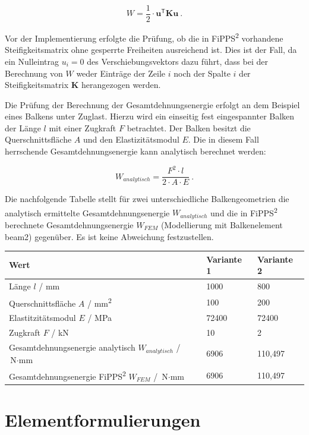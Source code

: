 \documentclass[11pt,titlepage,listof=totoc,bibliography=totoc,twoside]{scrreprt}
\newcommand{\transpose}{^\textsf{T}}
\begin{document}
\begin{equation}
  W = \frac{1}{2} \cdot \mathbf{u}\transpose \mathbf{K} \mathbf{u} \ .
\end{equation}

Vor der Implementierung erfolgte die Prüfung, ob die in FiPPS\textsuperscript{2} vorhandene Steifigkeitsmatrix ohne gesperrte Freiheiten ausreichend ist. Dies ist der Fall, da ein Nulleintrag $u_i = 0$ des Verschiebungsvektors dazu führt, dass bei der Berechnung von $W$ weder Einträge der Zeile $i$ noch der Spalte $i$ der Steifigkeitsmatrix $\mathbf{K}$ herangezogen werden.

Die Prüfung der Berechnung der Gesamtdehnungsenergie erfolgt an dem Beispiel eines Balkens unter Zuglast. Hierzu wird ein einseitig fest eingespannter Balken der Länge $l$ mit einer Zugkraft $F$ betrachtet. Der Balken besitzt die Querschnittsfläche $A$ und den Elastizitätsmodul $E$. Die in diesem Fall herrschende Gesamtdehnungsenergie kann analytisch berechnet werden:

\begin{equation}
  W_{analytisch} = \frac{F^2 \cdot l}{2 \cdot A \cdot E} \ .
\end{equation}

Die nachfolgende Tabelle stellt für zwei unterschiedliche Balkengeometrien die analytisch ermittelte Gesamtdehnungsenergie $W_{analytisch}$ und die in FiPPS\textsuperscript{2} berechnete Gesamtdehnungsenergie $W_{FEM}$ (Modellierung mit Balkenelement beam2) gegenüber. Es ist keine Abweichung festzustellen.

\begin{tabularx}{\textwidth}{Xll}
\toprule
Wert			& Variante 1			& Variante 2	\\
\midrule
Länge $l$ / mm & 1000 & 800 \\
Querschnittsfläche $A$ / mm\textsuperscript{2} & 100 & 200 \\
Elastitzitätsmodul $E$ / MPa & 72400 & 72400 \\
Zugkraft $F$ / kN & 10 & 2 \\
Gesamtdehnungsenergie analytisch $W_{analytisch}$ / $\text{N}\cdot\text{mm}$ & 6906 & 110,497 \\
Gesamtdehnungsenergie FiPPS\textsuperscript{2} $W_{FEM}$ / $\text{N}\cdot\text{mm}$ & 6906 & 110,497 \\
\bottomrule
\end{tabularx}

\chapter{Elementformulierungen}
\end{document}
